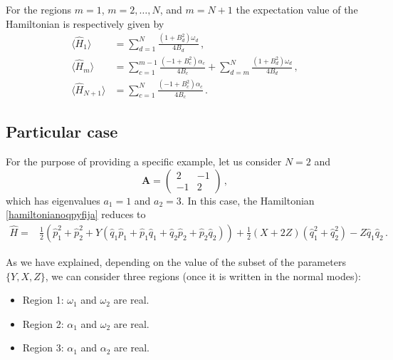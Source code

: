 \documentclass[12pt]{iopart}
\begin{document}
For the regions $m=1$, $m=2,\ldots, N$, and  $m=N+1$ the expectation value of the Hamiltonian is respectively given by 
\begin{subequations}
\begin{align}
\langle \hat{H}_{1} \rangle &= \sum_{d=1}^{N}\frac{(1+B_d^2)\omega_d}{4B_d}\,,\\
\langle \hat{H}_{m} \rangle &= \sum_{c=1}^{m-1}\frac{(-1+B_c^2)\alpha_c}{4B_c}+\sum_{d=m}^{N}\frac{(1+B_d^2)\omega_d}{4B_d}\,,\\
\langle \hat{H}_{N+1} \rangle &= \sum_{c=1}^{N}\frac{(-1+B_c^2)\alpha_c}{4B_c}\,.
\end{align}
\end{subequations}

\subsection{Particular case}

For the purpose of providing a specific example, let us  consider  $N=2$ and 
$$\boldsymbol{A}= \left(  \begin{array}{cc}
  2   & -1 \\
 -1    & 2
\end{array}
\right)\,,$$
which has eigenvalues $a_1=1$ and $a_2=3$. In this case, the Hamiltonian \eqref{hamiltonianoqpyfija} reduces to 
\begin{align}
    \hat{H}=&\frac{1}{2} \left(\hat{p}_1^2+\hat{p}_2^2+Y\left(\hat{q}_1 \hat{p}_1+\hat{p}_1 \hat{q}_1+\hat{q}_2 \hat{p}_2+\hat{p}_2 \hat{q}_2 \right) \right)+\frac{1}{2} \left(X+2Z\right)\left(\hat{q}_1^2+\hat{q}_2^2\right)-Z \hat{q}_1 \hat{q}_2\,.
    \label{particularcase}
\end{align}

As we have explained, depending on the value of the subset of the parameters  $\{ Y, X, Z \}$, we can consider three regions (once it is written in the normal modes): 
 \begin{itemize}
     \item Region 1: $\omega_1$ and $\omega_2$ are real.
     \item Region 2: $\alpha_1$ and $\omega_2$ are real.
     \item Region 3: $\alpha_1$ and $\alpha_2$ are real.
 \end{itemize}
\end{document}
